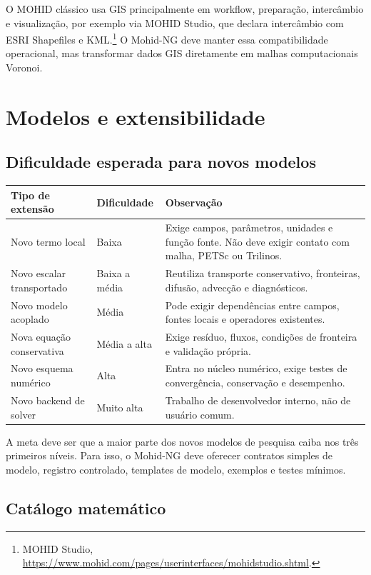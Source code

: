 \documentclass[11pt,a4paper]{article}
\begin{document}
O MOHID cl\'assico usa GIS principalmente em workflow, prepara\c{c}\~ao, interc\^ambio e visualiza\c{c}\~ao, por exemplo via MOHID Studio, que declara interc\^ambio com ESRI Shapefiles e KML.\footnote{MOHID Studio, \url{https://www.mohid.com/pages/userinterfaces/mohidstudio.shtml}.} O Mohid-NG deve manter essa compatibilidade operacional, mas transformar dados GIS diretamente em malhas computacionais Voronoi.

\section{Modelos e extensibilidade}

\subsection{Dificuldade esperada para novos modelos}

\begin{longtable}{p{}p{}p{}}
\toprule
\textbf{Tipo de extens\~ao} & \textbf{Dificuldade} & \textbf{Observa\c{c}\~ao}\tabularnewline
\midrule
Novo termo local & Baixa & Exige campos, par\^ametros, unidades e fun\c{c}\~ao fonte. N\~ao deve exigir contato com malha, PETSc ou Trilinos.\tabularnewline
Novo escalar transportado & Baixa a m\'edia & Reutiliza transporte conservativo, fronteiras, difus\~ao, advec\c{c}\~ao e diagn\'osticos.\tabularnewline
Novo modelo acoplado & M\'edia & Pode exigir depend\^encias entre campos, fontes locais e operadores existentes.\tabularnewline
Nova equa\c{c}\~ao conservativa & M\'edia a alta & Exige res\'iduo, fluxos, condi\c{c}\~oes de fronteira e valida\c{c}\~ao pr\'opria.\tabularnewline
Novo esquema num\'erico & Alta & Entra no n\'ucleo num\'erico, exige testes de converg\^encia, conserva\c{c}\~ao e desempenho.\tabularnewline
Novo backend de solver & Muito alta & Trabalho de desenvolvedor interno, n\~ao de usu\'ario comum.\tabularnewline
\bottomrule
\end{longtable}

A meta deve ser que a maior parte dos novos modelos de pesquisa caiba nos tr\^es primeiros n\'iveis. Para isso, o Mohid-NG deve oferecer contratos simples de modelo, registro controlado, templates de modelo, exemplos e testes m\'inimos.

\subsection{Cat\'alogo matem\'atico}
\end{document}
